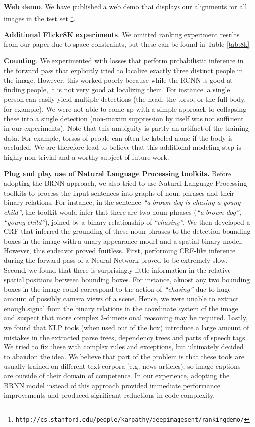 \documentclass[10pt,twocolumn,letterpaper]{article}
\begin{document}
\textbf{Web demo}. We have published a web demo that displays our alignments for all images in the test set \footnote{\tiny \texttt{http://cs.stanford.edu/people/karpathy/deepimagesent/rankingdemo/}}.

\textbf{Additional Flickr8K experiments}. We omitted ranking experiment results from our paper due to space constraints, but these can be found in Table \ref{tab:8k}

\textbf{Counting}. We experimented with losses that perform probabilistic inference in the forward pass that explicitly tried to localize exactly three distinct people in the image. However, this worked poorly because while the RCNN is good at finding people, it is not very good at localizing them. For instance, a single person can easily yield multiple detections (the head, the torso, or the full body, for example). We were not able to come up with a simple approach to collapsing these into a single detection (non-maxim suppression by itself was not sufficient in our experiments). Note that this ambiguity is partly an artifact of the training data. For example, torsos of people can often be labeled alone if the body is occluded. We are therefore lead to believe that this additional modeling step is highly non-trivial and a worthy subject of future work.

\textbf{Plug and play use of Natural Language Processing toolkits.} Before adopting the BRNN approach, we also tried to use Natural Language Processing toolkits to process the input sentences into graphs of noun phrases and their binary relations. For instance, in the sentence \textit{``a brown dog is chasing a young child''}, the toolkit would infer that there are two noun phrases (\textit{``a brown dog'', ``young child''}), joined by a binary relationship of \textit{``chasing''}. We then developed a CRF that inferred the grounding of these noun phrases to the detection bounding boxes in the image with a unary appearance model and a spatial binary model. However, this endeavor proved fruitless. First, performing CRF-like inference during the forward pass of a Neural Network proved to be extremely slow. Second, we found that there is surprisingly little information in the relative spatial positions between bounding boxes. For instance, almost any two bounding boxes in the image could correspond to the action of \textit{``chasing''} due to huge amount of possibly camera views of a scene. Hence, we were unable to extract enough signal from the binary relations in the coordinate system of the image and suspect that more complex 3-dimensional reasoning may be required. Lastly, we found that NLP tools (when used out of the box) introduce a large amount of mistakes in the extracted parse trees, dependency trees and parts of speech tags. We tried to fix these with complex rules and exceptions, but ultimately decided to abandon the idea. We believe that part of the problem is that these tools are usually trained on different text corpora (e.g. news articles), so image captions are outside of their domain of competence. In our experience, adopting the BRNN model instead of this approach provided immediate performance improvements and produced significant reductions in code complexity.
\end{document}
